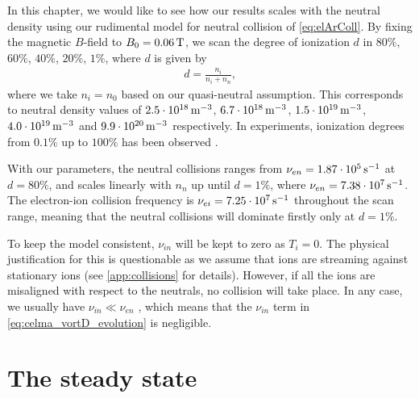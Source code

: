 In this chapter, we would like to see how our results scales with the neutral density using our rudimental model for neutral collision of \cref{eq:elArColl}.
By fixing the magnetic $B$-field to $B_0=0.06\, \text{T}$, we scan the degree of ionization $d$ in $80\%$, $60\%$, $40\%$, $20\%$, $1\%$, where $d$ is given by
%
\begin{align*}
    d = \frac{n_i}{n_i+n_n},
\end{align*}
%
where we take $n_i=n_0$ based on our quasi-neutral assumption.
This corresponds to neutral density values of
$2.5\cdot10^{18}\, \text{m}^{-3}$,
$6.7\cdot10^{18}\, \text{m}^{-3}$,
$1.5\cdot10^{19}\, \text{m}^{-3}$,
$4.0\cdot10^{19}\, \text{m}^{-3}$ and
$9.9\cdot10^{20}\, \text{m}^{-3}$
respectively.
In experiments, ionization degrees from $0.1\%$ up to $100\%$ has been observed \cite{Schroder2003Phd}.

With our parameters, the neutral collisions ranges from $\nu_{en}=1.87\cdot10^{5}\, \text{s}^{-1}$ at $d=80\%$, and scales linearly with $n_n$ up until $d=1\%$, where $\nu_{en}=7.38\cdot10^7\, \text{s}^{-1}$.
The electron-ion collision frequency is $\nu_{ei}=7.25\cdot10^7 \, \text{s}^{-1}$ throughout the scan range, meaning that the neutral collisions will dominate firstly only at $d=1\%$.

To keep the model consistent, $\nu_{in}$ will be kept to zero as $T_i=0$.
The physical justification for this is questionable as we assume that ions are streaming against stationary ions (see \cref{app:collisions} for details).
However, if all the ions are misaligned with respect to the neutrals, no collision will take place.
In any case, we usually have $\nu_{in}\ll\nu_{en}$ \cite{Schroder2003Phd}, which means that the $\nu_{in}$ term in \cref{eq:celma_vortD_evolution} is negligible.

\section{The steady state}

